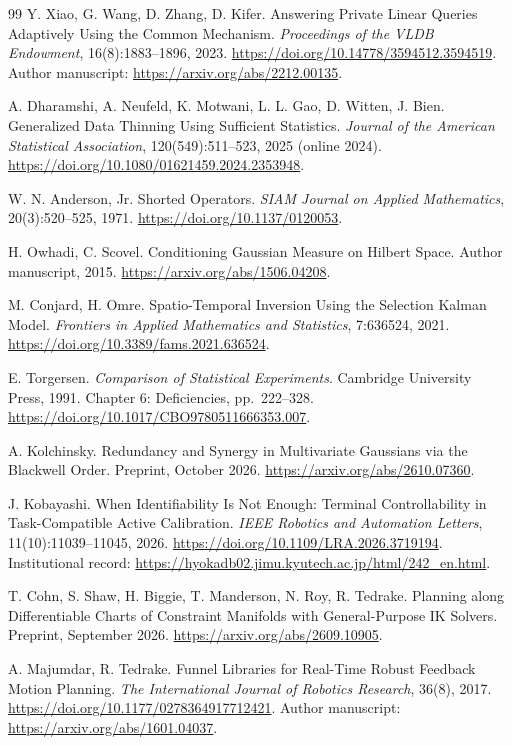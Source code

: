 \documentclass[UTF8,fontset=fandol,zihao=5,a4paper]{ctexart}
\theoremstyle{definition}
\theoremstyle{remark}\newtheorem{remark}[theorem]{说明}
\numberwithin{equation}{section}
\begin{document}
\begin{thebibliography}{99}
\small
{} Y. Xiao, G. Wang, D. Zhang, D. Kifer.
Answering Private Linear Queries Adaptively Using the Common Mechanism.
\emph{Proceedings of the VLDB Endowment}, 16(8):1883--1896, 2023.
\url{https://doi.org/10.14778/3594512.3594519}.
Author manuscript: \url{https://arxiv.org/abs/2212.00135}.

 A. Dharamshi, A. Neufeld, K. Motwani, L. L. Gao, D. Witten, J. Bien.
Generalized Data Thinning Using Sufficient Statistics.
\emph{Journal of the American Statistical Association}, 120(549):511--523, 2025 (online 2024).
\url{https://doi.org/10.1080/01621459.2024.2353948}.

 W. N. Anderson, Jr.
Shorted Operators.
\emph{SIAM Journal on Applied Mathematics}, 20(3):520--525, 1971.
\url{https://doi.org/10.1137/0120053}.

 H. Owhadi, C. Scovel.
Conditioning Gaussian Measure on Hilbert Space.
Author manuscript, 2015.
\url{https://arxiv.org/abs/1506.04208}.

 M. Conjard, H. Omre.
Spatio-Temporal Inversion Using the Selection Kalman Model.
\emph{Frontiers in Applied Mathematics and Statistics}, 7:636524, 2021.
\url{https://doi.org/10.3389/fams.2021.636524}.

 E. Torgersen.
\emph{Comparison of Statistical Experiments}. Cambridge University Press, 1991.
Chapter 6: Deficiencies, pp.\ 222--328.
\url{https://doi.org/10.1017/CBO9780511666353.007}.

 A. Kolchinsky.
Redundancy and Synergy in Multivariate Gaussians via the Blackwell Order.
Preprint, October 2026.
\url{https://arxiv.org/abs/2610.07360}.

 J. Kobayashi.
When Identifiability Is Not Enough: Terminal Controllability in Task-Compatible Active Calibration.
\emph{IEEE Robotics and Automation Letters}, 11(10):11039--11045, 2026.
\url{https://doi.org/10.1109/LRA.2026.3719194}.
Institutional record: \url{https://hyokadb02.jimu.kyutech.ac.jp/html/242_en.html}.

 T. Cohn, S. Shaw, H. Biggie, T. Manderson, N. Roy, R. Tedrake.
Planning along Differentiable Charts of Constraint Manifolds with General-Purpose IK Solvers.
Preprint, September 2026.
\url{https://arxiv.org/abs/2609.10905}.

 A. Majumdar, R. Tedrake.
Funnel Libraries for Real-Time Robust Feedback Motion Planning.
\emph{The International Journal of Robotics Research}, 36(8), 2017.
\url{https://doi.org/10.1177/0278364917712421}.
Author manuscript: \url{https://arxiv.org/abs/1601.04037}.


\end{thebibliography}
\end{document}
